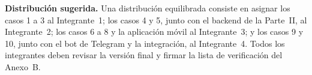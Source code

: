 \noindent\textbf{Distribución sugerida.} Una distribución equilibrada consiste en asignar los casos 1 a 3 al Integrante~1; los casos 4 y 5, junto con el backend de la Parte~II, al Integrante~2; los casos 6 a 8 y la aplicación móvil al Integrante~3; y los casos 9 y 10, junto con el bot de Telegram y la integración, al Integrante~4. Todos los integrantes deben revisar la versión final y firmar la lista de verificación del Anexo~B.
